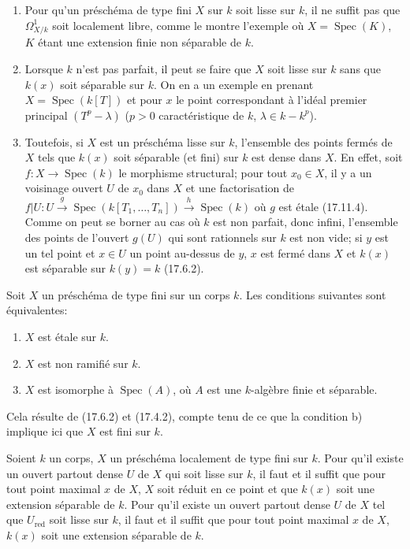 \begin{remarks}[17.15.10]
\label{IV.17.15.10}
\begin{enumerate}
  \item[(i)] Pour qu'un préschéma de type fini $X$ sur $k$ soit lisse sur $k$, il ne suffit pas que $\Omega^1_{X/k}$ soit localement libre, comme le montre l'exemple où $X=\operatorname{Spec}(K)$, $K$ étant une extension finie non séparable de $k$.
  \item[(ii)] Lorsque $k$ n'est pas parfait, il peut se faire que $X$ soit lisse sur $k$ sans que $k(x)$ soit séparable sur $k$. On en a un exemple en prenant $X=\operatorname{Spec}(k[T])$ et pour $x$ le point correspondant à l'idéal premier principal $(T^p-\lambda)$ ($p>0$ caractéristique de $k$, $\lambda\in k-k^p$).
  \item[(iii)] Toutefois, si $X$ est un préschéma lisse sur $k$, l'ensemble des points fermés de $X$ tels que $k(x)$ soit séparable (et fini) sur $k$ est dense dans $X$. En effet, soit $f:X\to\operatorname{Spec}(k)$ le morphisme structural; pour tout $x_0\in X$, il y a un voisinage ouvert $U$ de $x_0$ dans $X$ et une factorisation de $f|U:U\xrightarrow{g}\operatorname{Spec}(k[T_1,\ldots,T_n])\xrightarrow{h}\operatorname{Spec}(k)$ où $g$ est étale (17.11.4). Comme on peut se borner au cas où $k$ est non parfait, donc infini, l'ensemble des points de l'ouvert $g(U)$ qui sont rationnels sur $k$ est non vide; si $y$ est un tel point et $x\in U$ un point au-dessus de $y$, $x$ est fermé dans $X$ et $k(x)$ est séparable sur $k(y)=k$ (17.6.2).
\end{enumerate}
\end{remarks}

\begin{proposition}[17.15.11]
\label{IV.17.15.11}
Soit $X$ un préschéma de type fini sur un corps $k$. Les conditions suivantes sont équivalentes:
\begin{enumerate}
  \item[a)] $X$ est étale sur $k$.
  \item[b)] $X$ est non ramifié sur $k$.
  \item[c)] $X$ est isomorphe à $\operatorname{Spec}(A)$, où $A$ est une $k$-algèbre finie et séparable.
\end{enumerate}
\end{proposition}

Cela résulte de (17.6.2) et (17.4.2), compte tenu de ce que la condition b) implique ici que $X$ est fini sur $k$.

\begin{proposition}[17.15.12]
\label{IV.17.15.12}
Soient $k$ un corps, $X$ un préschéma localement de type fini sur $k$. Pour qu'il existe un ouvert partout dense $U$ de $X$ qui soit lisse sur $k$, il faut et il suffit que pour tout point maximal $x$ de $X$, $X$ soit réduit en ce point et que $k(x)$ soit une extension séparable de $k$. Pour qu'il existe un ouvert partout dense $U$ de $X$ tel que $U_{\mathrm{red}}$ soit lisse sur $k$, il faut et il suffit que pour tout point maximal $x$ de $X$, $k(x)$ soit une extension séparable de $k$.
\end{proposition}

